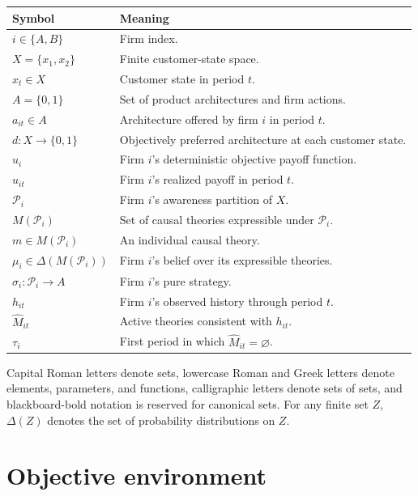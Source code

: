 \documentclass[11pt]{article}
\newcommand{\emptysetset}{\varnothing}
\begin{document}
\begin{center}
\renewcommand{\arraystretch}{1.18}
\begin{tabularx}{\textwidth}{@{}>{\raggedright\arraybackslash}p{}X@{}}
\toprule
\textbf{Symbol} & \textbf{Meaning} \\
\midrule
$i\in\{A,B\}$ & Firm index. \\
$X=\{x_1,x_2\}$ & Finite customer-state space. \\
$x_t\in X$ & Customer state in period $t$. \\
$A=\{0,1\}$ & Set of product architectures and firm actions. \\
$a_{it}\in A$ & Architecture offered by firm $i$ in period $t$. \\
$d:X\to\{0,1\}$ & Objectively preferred architecture at each customer state. \\
$u_i$ & Firm $i$'s deterministic objective payoff function. \\
$u_{it}$ & Firm $i$'s realized payoff in period $t$. \\
$\mathcal P_i$ & Firm $i$'s awareness partition of $X$. \\
$M(\mathcal P_i)$ & Set of causal theories expressible under $\mathcal P_i$. \\
$m\in M(\mathcal P_i)$ & An individual causal theory. \\
$\mu_i\in\Delta(M(\mathcal P_i))$ & Firm $i$'s belief over its expressible theories. \\
$\sigma_i:\mathcal P_i\to A$ & Firm $i$'s pure strategy. \\
$h_{it}$ & Firm $i$'s observed history through period $t$. \\
$\widehat M_{it}$ & Active theories consistent with $h_{it}$. \\
$\tau_i$ & First period in which $\widehat M_{it}=\emptysetset$. \\
\bottomrule
\end{tabularx}
\end{center}

Capital Roman letters denote sets, lowercase Roman and Greek letters denote elements, parameters, and functions, calligraphic letters denote sets of sets, and blackboard-bold notation is reserved for canonical sets.  For any finite set $Z$, $\Delta(Z)$ denotes the set of probability distributions on $Z$.

\section{Objective environment}
\end{document}
